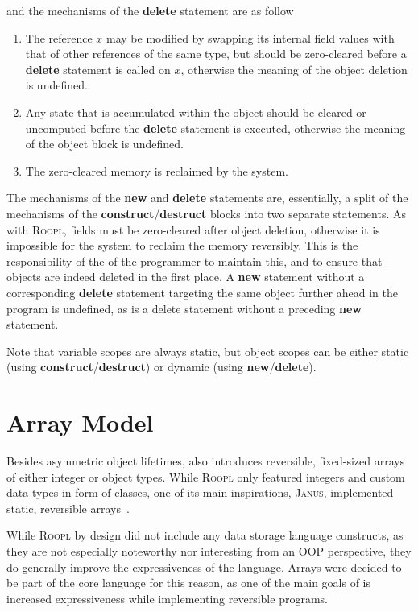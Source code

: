 and the mechanisms of the \textbf{delete} statement are as follow

\begin{enumerate}
    \item The reference $x$ may be modified by swapping its internal field values with that of other references of the same type, but should be zero-cleared before a \textbf{delete} statement is called on $x$, otherwise the meaning of the object deletion is undefined.
    \item Any state that is accumulated within the object should be cleared or uncomputed before the \textbf{delete} statement is executed, otherwise the meaning of the object block is undefined.
    \item The zero-cleared memory is reclaimed by the system.
\end{enumerate}

The mechanisms of the \textbf{new} and \textbf{delete} statements are, essentially, a split of the mechanisms of the \textbf{construct}/\textbf{destruct} blocks into two separate statements. As with \textsc{Roopl}, fields must be zero-cleared after object deletion, otherwise it is impossible for the system to reclaim the memory reversibly. This is the responsibility of the of the programmer to maintain this, and to ensure that objects are indeed deleted in the first place. A \textbf{new} statement without a corresponding \textbf{delete} statement targeting the same object further ahead in the program is undefined, as is a delete statement without a preceding \textbf{new} statement.

Note that variable scopes are always static, but object scopes can be either static (using \textbf{construct}/\textbf{destruct}) or dynamic (using \textbf{new}/\textbf{delete}).
\newpage

\section{Array Model}
\label{sec:array-model}
Besides asymmetric object lifetimes, \rooplpp also introduces reversible, fixed-sized arrays of either integer or object types. While \textsc{Roopl} only featured integers and custom data types in form of classes, one of its main inspirations, \textsc{Janus}, implemented static, reversible arrays~\cite{ty:janus}. 

While \textsc{Roopl} by design did not include any data storage language constructs, as they are not especially noteworthy nor interesting from an OOP perspective, they do generally improve the expressiveness of the language. Arrays were decided to be part of the core language for this reason, as one of the main goals of \rooplpp is increased expressiveness while implementing reversible programs.

